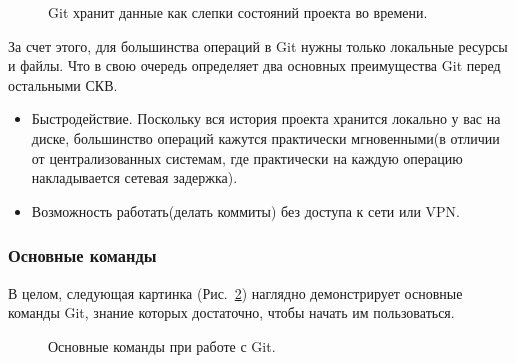 \documentclass{article}
\begin{document}
			\begin{figure}[h!]
				\caption{Git хранит данные как слепки состояний проекта во времени.}
				\label{ris:git}
			\end{figure}
			\newpage
				За счет этого, для большинства операций в Git нужны только локальные ресурсы и файлы. Что в свою очередь 						определяет два основных преимущества Git перед остальными СКВ.
			\begin{itemize}
	    		\item	Быстродействие. Поскольку вся история проекта хранится локально у вас на диске, большинство операций 							кажутся практически мгновенными(в отличии от централизованных системам, где практически на каждую операцию 							накладывается сетевая задержка).
	    		\item	Возможность работать(делать коммиты) без доступа к сети или VPN.
			\end{itemize}
			\newpage
			\subsubsection{Основные команды}
			В целом, следующая картинка (Рис.~\ref{ris:git-command}) наглядно демонстрирует основные команды Git, знание которых 			достаточно, чтобы начать им пользоваться.
			
		\begin{figure}[h]
			\caption{Основные команды при работе с Git.}
			\label{ris:git-command}
		\end{figure}
		\newpage
\end{document}
